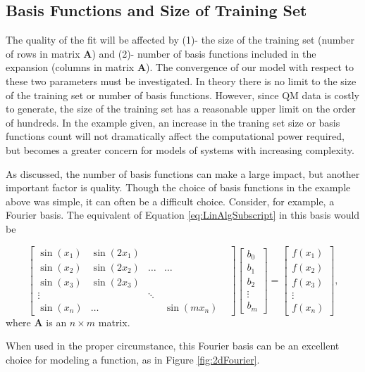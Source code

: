 \subsection{Basis Functions and Size of Training Set}\label{Sect:samplesAndFunctions}
\par The quality of the fit will be affected by (1)- the size of the training set (number of rows in matrix $\mathbf{A}$) and (2)- number of basis functions included in the expansion (columns in matrix $\mathbf{A}$). The convergence of our model with respect to these two parameters must be investigated. In theory there is no limit to the size of the training set or number of basis functions. However, since QM data is costly to generate, the size of the training set has a reasonable upper limit on the order of hundreds. In the example given, an increase in the traning set size or basis functions count will not dramatically affect the computational power required, but becomes a greater concern for models of systems with increasing complexity. 
\par As discussed, the number of basis functions can make a large impact, but another important factor is quality. Though the choice of basis functions in the example above was simple, it can often be a difficult choice. Consider, for example, a Fourier basis. The equivalent of Equation \ref{eq:LinAlgSubscript} in this basis would be

\begin{equation} \label{eq:fourierBasis}
\begin{bmatrix}
\sin(x_1) & \sin(2x_1) \\
\sin(x_2) & \sin(2x_2) & \ldots & \ldots \\
\sin(x_3) & \sin(2x_3) \\
\vdots & & \ddots & & \\
\sin(x_n) & \ldots & & \sin(mx_n)
\end{bmatrix}
\begin{bmatrix}
b_0 \\
b_1 \\
b_2 \\
\vdots \\
b_m 
\end{bmatrix}
=
\begin{bmatrix}
f(x_1) \\ 
f(x_2) \\
f(x_3) \\ 
\vdots \\
f(x_n)
\end{bmatrix},
\end{equation}
where $\mathbf{A}$ is an $n\times m$ matrix.
\par When used in the proper circumstance, this Fourier basis can be an excellent choice for modeling a function, as in Figure \ref{fig:2dFourier}.

